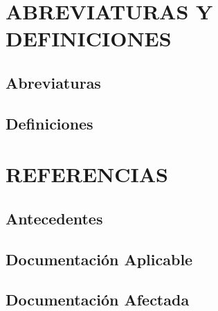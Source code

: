 \documentclass[a4paper,11pt,oneside,po,lpo]{INF-GF}
\begin{document}
	
\portada
	
\tableofcontents   
	

\section{ABREVIATURAS Y DEFINICIONES}
\subsection{Abreviaturas}

\subsection{Definiciones}

\section{REFERENCIAS}
\subsection{Antecedentes}

\subsection{Documentaci\'{o}n Aplicable}

\subsection{Documentaci\'{o}n Afectada}
\end{document}

